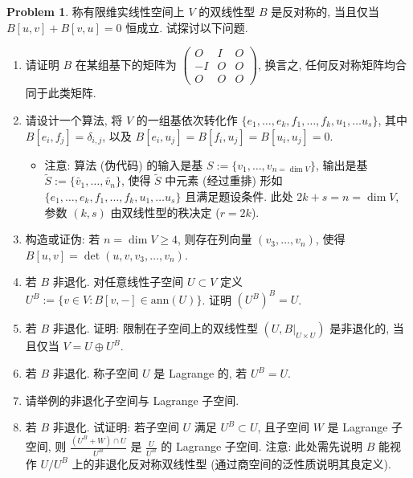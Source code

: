 \documentclass{MainStyle}
\theoremstyle{definition}
\newtheorem{problem}{Problem}
\begin{document}
\begin{problem}
称有限维实线性空间上 $V$ 的双线性型 $B$ 是反对称的, 当且仅当 $B[u,v]+B[v,u]=0$ 恒成立. 试探讨以下问题.
\begin{enumerate}
    \item 请证明 $B$ 在某组基下的矩阵为 $\begin{pmatrix}O&I&O\\-I&O&O\\O&O&O\end{pmatrix}$, 换言之, 任何反对称矩阵均合同于此类矩阵.
    \item 请设计一个算法, 将 $V$ 的一组基依次转化作 $\{e_1,\ldots, e_k,f_1,\ldots, f_k,u_1,\ldots u_s\}$, 其中 $B[e_i,f_j]=\delta_{i,j}$, 以及 $B[e_i,u_j]=B[f_i,u_j]=B[u_i,u_j]=0$.
          \begin{itemize}
              \item 注意: 算法 (伪代码) 的输入是基 $S:=\{v_1,\ldots, v_{n=\dim V}\}$, 输出是基 $\widetilde S:=\{\widetilde {v_1},\ldots,\widetilde {v_n}\}$, 使得 $\widetilde S$ 中元素 (经过重排) 形如 $\{e_1,\ldots, e_k,f_1,\ldots, f_k,u_1,\ldots u_s\}$ 且满足题设条件. 此处 $2k+s=n=\dim V$, 参数 $(k,s)$ 由双线性型的秩决定 ($r=2k$).
          \end{itemize}
    \item 构造或证伪: 若 $n=\dim V\geq 4$, 则存在列向量 $(v_3,\ldots ,v_n)$, 使得 $B[u,v]=\det (u,v,v_3,\ldots, v_n)$.
    \item 若 $B$ 非退化. 对任意线性子空间 $U\subset V$ 定义 $U^B:=\{ v\in V: B[v,-]\in  \mathrm{ann}(U)\}$. 证明 $(U^B)^B=U$.
    \item 若 $B$ 非退化. 证明: 限制在子空间上的双线性型 $(U,B|_{U\times U})$ 是非退化的, 当且仅当 $V=U\oplus U^B$.
    \item 若 $B$ 非退化. 称子空间 $U$ 是 Lagrange 的, 若 $U^B=U$.
    \item 请举例的非退化子空间与 Lagrange 子空间.
    \item 若 $B$ 非退化. 试证明: 若子空间 $U$ 满足 $U^B\subset U$, 且子空间 $W$ 是 Lagrange 子空间, 则 $\frac{(U^B+W)\cap U}{U^B}$ 是 $\frac{U}{U^B}$ 的 Lagrange 子空间. 注意: 此处需先说明 $B$ 能视作 $U/U^B$ 上的非退化反对称双线性型 (通过商空间的泛性质说明其良定义).
\end{enumerate}
\end{problem}
\end{document}

